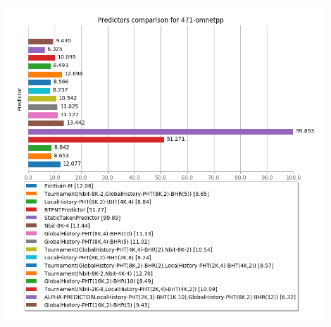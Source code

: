    \begin{minipage}{\textwidth}
      \begin{center}
         \\
         \vspace{3mm}
         \includegraphics[width=0.9\textwidth, frame]{./graphs/4-5/471-omnetpp.png}
         \vspace{6mm}
      \end{center}
   \end{minipage}

